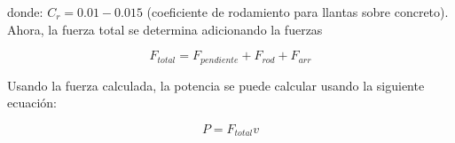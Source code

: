 \documentclass[12pt]{book}
\theoremstyle{definition}
\theoremstyle{remark}
\theoremstyle{plain}
\begin{document}
donde: $C_r=0.01-0.015$ (coeficiente de rodamiento para llantas sobre concreto).
Ahora, la fuerza total se determina adicionando la fuerzas

\begin{equation}
\label{equ203}
F_{total}= F_{pendiente}+F_{rod}+F_{arr}
\end{equation}

Usando la fuerza calculada, la potencia se puede calcular usando la siguiente ecuación:

\begin{equation}
\label{equ204}
P=F_{total}v
\end{equation}


\backmatter
\end{document}
